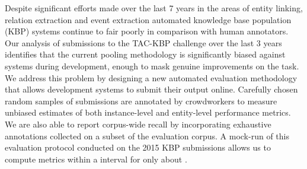 Despite significant efforts made over the last 7 years in the areas of entity linking, relation extraction and event extraction automated knowledge base population (KBP) systems continue to fair poorly in comparison with human annotators.
Our analysis of submissions to the TAC-KBP challenge over the last 3 years identifies that the current pooling methodology is significantly biased against systems during development, enough to mask genuine improvements on the task.
We address this problem by designing a new automated evaluation methodology that 
  allows development systems to submit their output online.
Carefully chosen random samples of submissions are annotated by crowdworkers to
  measure unbiased estimates of both instance-level and entity-level performance metrics.
We are also able to report corpus-wide recall by incorporating exhaustive annotations collected on a subset of the evaluation corpus.
A mock-run of this evaluation protocol conducted on the 2015 KBP submissions allows us to compute metrics within a  interval for only about .
  
